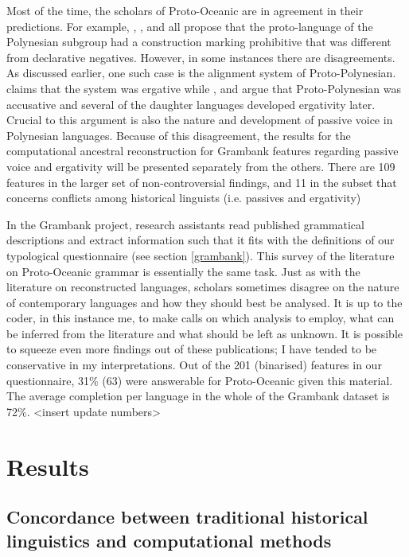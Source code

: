 \documentclass[a4paper,10pt]{article} %
\begin{document}
Most of the time, the scholars of Proto-Oceanic are in agreement in their predictions. For example, \citet[142]{pawley1973some}, \citet[292]{ross2007two}, \citet[xiii, 125]{clark1976aspects} and \citet[89]{lynchrosscrowley_proto_grammar_oceanic} all propose that the proto-language of the Polynesian subgroup had a construction marking prohibitive that was different from declarative negatives. However, in some instances there are disagreements. As discussed earlier, one such case is the alignment system of Proto-Polynesian. \citet{clark1976aspects} claims that the system was ergative while \citet{hale_1968}, \citet{hohepa_1967,hohepa_1969} and \citet{chung1978} argue that Proto-Polynesian was accusative and several of the daughter languages developed ergativity later. Crucial to this argument is also the nature and development of passive voice in Polynesian languages. Because of this disagreement, the results for the computational ancestral reconstruction for Grambank features regarding passive voice and ergativity will be presented separately from the others. There are 109 features in the larger set of non-controversial findings, and 11 in the subset that concerns conflicts among historical linguists (i.e. passives and ergativity)

In the Grambank project, research assistants read published grammatical descriptions and extract information such that it fits with the definitions of our typological questionnaire (see section \ref{grambank}). This survey of the literature on Proto-Oceanic grammar is essentially the same task. Just as with the literature on reconstructed languages, scholars sometimes disagree on the nature of contemporary languages and how they should best be analysed. It is up to the coder, in this instance me, to make calls on which analysis to employ, what can be inferred from the literature and what should be left as unknown. It is possible to squeeze even more findings out of these publications; I have tended to be conservative in my interpretations. Out of the 201 (binarised) features in our questionnaire, 31\% (63) were answerable for Proto-Oceanic given this material. The average completion per language in the whole of the Grambank dataset is 72\%. <insert update numbers>

\newpage
\section{Results}

\subsection{Concordance between traditional historical linguistics and computational methods}
\end{document}
